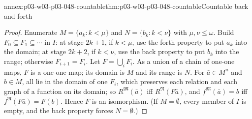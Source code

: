 \begin{annexitem}{annex:p03-w03-p03-048-countable}{thm:p03-w03-p03-048-countable}{Countable back and forth}
\begin{proof}
Enumerate \(M=\{a_k:k<\mu\}\) and \(N=\{b_k:k<\nu\}\) with
\(\mu,\nu\leq\omega\).  Build \(F_0\subseteq F_1\subseteq\cdots\) in \(I\):
at stage \(2k+1\), if \(k<\mu\), use the forth property to put \(a_k\) into
the domain; at stage \(2k+2\), if \(k<\nu\), use the back property to put
\(b_k\) into the range; otherwise \(F_{i+1}=F_i\).  Let
\(F=\bigcup_iF_i\).  As a union of a chain of one-one maps, \(F\) is a
one-one map; its domain is \(M\) and its range is \(N\).  For \(\bar a\in
M^{n}\) and \(b\in M\), all lie in the domain of one \(F_i\), which preserves
each relation and each graph of a function on its domain; so
\(R^{\mathfrak M}(\bar a)\) iff \(R^{\mathfrak N}(F\bar a)\), and
\(f^{\mathfrak M}(\bar a)=b\) iff \(f^{\mathfrak N}(F\bar a)=F(b)\).  Hence
\(F\) is an isomorphism.  (If \(M=\emptyset\), every member of \(I\) is
empty, and the back property forces \(N=\emptyset\).)
\end{proof}
\end{annexitem}

